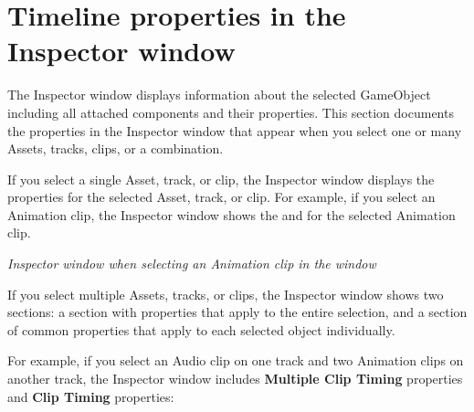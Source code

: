 \chapter{Timeline properties in the Inspector window}
\hypertarget{md__hey_tea_9_2_library_2_package_cache_2com_8unity_8timeline_0d1_87_85_2_documentation_0i_2insp__about}{}\label{md__hey_tea_9_2_library_2_package_cache_2com_8unity_8timeline_0d1_87_85_2_documentation_0i_2insp__about}
\label{md__hey_tea_9_2_library_2_package_cache_2com_8unity_8timeline_0d1_87_85_2_documentation_0i_2insp__about_autotoc_md4651}%
%
 The Inspector window displays information about the selected Game\+Object including all attached components and their properties. This section documents the properties in the Inspector window that appear when you select one or many  Assets, tracks, clips, or a combination.

If you select a single  Asset, track, or clip, the Inspector window displays the properties for the selected Asset, track, or clip. For example, if you select an Animation clip, the Inspector window shows the  and  for the selected Animation clip.



{\itshape Inspector window when selecting an Animation clip in the  window}

If you select multiple  Assets, tracks, or clips, the Inspector window shows two sections\+: a section with properties that apply to the entire selection, and a section of common properties that apply to each selected object individually.

For example, if you select an Audio clip on one track and two Animation clips on another track, the Inspector window includes {\bfseries{Multiple Clip Timing}} properties and {\bfseries{Clip Timing}} properties\+:



